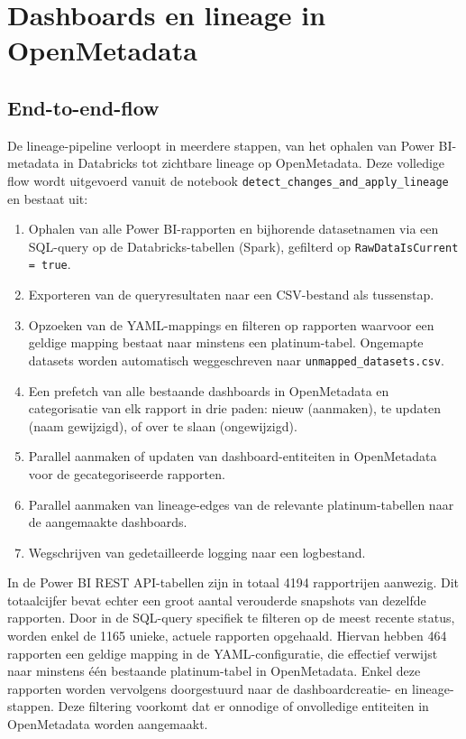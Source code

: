 \section{Dashboards en lineage in OpenMetadata}

\subsection{End-to-end-flow}

De lineage-pipeline verloopt in meerdere stappen, van het ophalen van Power BI-metadata in Databricks tot zichtbare lineage op OpenMetadata. Deze volledige flow wordt uitgevoerd vanuit de notebook \texttt{detect\_changes\_and\_apply\_lineage} en bestaat uit:
\begin{enumerate}
	\item Ophalen van alle Power BI-rapporten en bijhorende datasetnamen via een SQL-query op de Databricks-tabellen (Spark), gefilterd op \texttt{RawDataIsCurrent = true}.
	\item Exporteren van de queryresultaten naar een CSV-bestand als tussenstap.
	\item Opzoeken van de YAML-mappings en filteren op rapporten waarvoor een geldige mapping bestaat naar minstens een platinum-tabel. Ongemapte datasets worden automatisch weggeschreven naar \texttt{unmapped\_datasets.csv}.
	\item Een prefetch van alle bestaande dashboards in OpenMetadata en categorisatie van elk rapport in drie paden: nieuw (aanmaken), te updaten (naam gewijzigd), of over te slaan (ongewijzigd).
	\item Parallel aanmaken of updaten van dash\-board-en\-ti\-tei\-ten in OpenMetadata voor de gecategoriseerde rapporten.
	\item Parallel aanmaken van lineage-edges van de relevante platinum-tabellen naar de aangemaakte dashboards.
	\item Wegschrijven van gedetailleerde logging naar een logbestand.
\end{enumerate}

In de Power BI REST API-tabellen zijn in totaal 4194 rapportrijen aanwezig. Dit totaalcijfer bevat echter een groot aantal verouderde snapshots van dezelfde rapporten. Door in de SQL-query specifiek te filteren op de meest recente status, worden enkel de 1165 unieke, actuele rapporten opgehaald. Hiervan hebben 464 rapporten een geldige mapping in de YAML-configuratie, die effectief verwijst naar minstens één bestaande platinum-tabel in OpenMetadata. Enkel deze rapporten worden vervolgens doorgestuurd naar de dashboardcreatie- en lineage-stappen. Deze filtering voorkomt dat er onnodige of onvolledige entiteiten in OpenMetadata worden aangemaakt.\\


